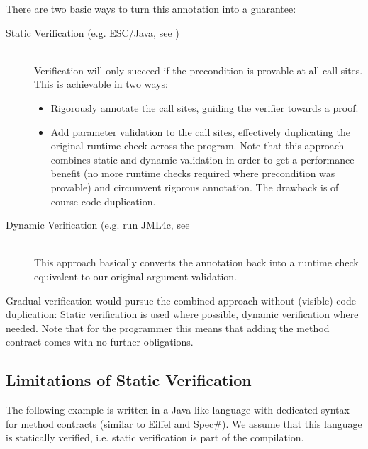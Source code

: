 There are two basic ways to turn this annotation into a guarantee:
\begin{description}
    \item[Static Verification (e.g. ESC/Java, see \cite{leino2000esc})]~\\
    Verification will only succeed if the precondition is provable at all call sites.
    This is achievable in two ways:
    \begin{itemize}
        \item
        Rigorously annotate the call sites, guiding the verifier towards a proof.
        \item 
        Add parameter validation to the call sites, effectively duplicating the original runtime check across the program.
        Note that this approach combines static and dynamic validation in order to get a performance benefit (no more runtime checks required where precondition was provable) and circumvent rigorous annotation.
        The drawback is of course code duplication.
    \end{itemize}
    
    
    \item[Dynamic Verification (e.g. run JML4c, see \cite{sarcar2010new}]~\\
    This approach basically converts the annotation back into a runtime check equivalent to our original argument validation.
\end{description}

Gradual verification would pursue the combined approach without (visible) code duplication:
Static verification is used where possible, dynamic verification where needed.
Note that for the programmer this means that adding the method contract comes with no further obligations.

\subsection{Limitations of Static Verification}
The following example is written in a Java-like language with dedicated syntax for method contracts (similar to Eiffel and Spec\#).
We assume that this language is statically verified, i.e. static verification is part of the compilation.

